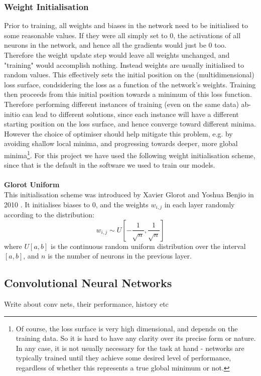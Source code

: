 \documentclass[11pt]{article} %
\theoremstyle{plain}
\theoremstyle{definition}
\begin{document}
\subsubsection{Weight Initialisation}
Prior to training, all weights and biases in the network need to be initialised to some reasonable values. If they were all simply set to 0, the activations of all neurons in the network, and hence all the gradients would just be 0 too. Therefore the weight update step would leave all weights unchanged, and "training" would accomplish nothing. Instead weights are usually initialised to random values. This effectively sets the initial position on the (multidimensional) loss surface, condsidering the loss as a function of the network's weights. Training then proceeds from this initial position towards a minimum of this loss function. Therefore performing different instances of training (even on the same data) ab-initio can lead to different solutions, since each instance will have a different starting position on the loss surface, and hence converge toward different minima. However the choice of optimiser should help mitigate this problem, e.g. by avoiding shallow local minima, and progressing towards deeper, more global minima\footnote{Of course, the loss surface is very high dimensional, and depends on the training data. So it is hard to have any clarity over its precise form or nature. In any case, it is not usually necessary for the task at hand - networks are typically trained until they achieve some desired level of performance, regardless of whether this represents a true global minimum or not.}. For this project we have used the following weight initialisation scheme, since that is the default in the software we used to train our models.
\\
\\
\noindent
\textbf{Glorot Uniform}
\\
\noindent
This initialisation scheme was introduced by Xavier Glorot and Yoshua Benjio in 2010 \cite{glorot_uniform}. It initialises biases to 0, and the weights \(w_{i,j}\) in each layer randomly according to the distribution:
\[ w_{i,j} \sim U[-\dfrac{1}{\sqrt{n}}, \dfrac{1}{\sqrt{n}}] \]
where \(U[a,b]\) is the continuous random uniform distribution over the interval \([a,b]\), and \(n\) is the number of neurons in the previous layer.

\newpage
\subsection{Convolutional Neural Networks}
Write about conv nets, their performance, history etc
\end{document}
